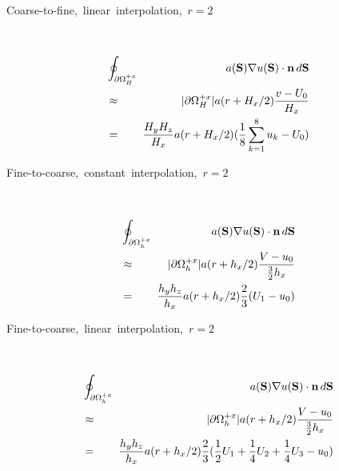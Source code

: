 \documentclass[10pt]{article}
\begin{document}
\begin{minipage}{1.75in}
\mbox{Coarse-to-fine, linear interpolation, $r=2$} \\
\end{minipage} \ \ \ \ 
\begin{minipage}{4.00in}
\begin{eqnarray*}
& \oint_{\partial\Omega_H^{+x}} \!\!\! & a(\textbf{S}) \nabla u(\textbf{S})\cdot \textbf{n} \, d\textbf{S}  \\
& \approx & |\partial\Omega_H^{+x}| a(r+H_x/2) \frac{v - U_0}{H_x} \\
& = & \frac{H_yH_z}{H_x}  a(r+H_x/2) (\frac{1}{8} \sum_{k=1}^8 u_k - U_0)   \\
\end{eqnarray*}
\end{minipage}

\begin{minipage}{1.75in}
\mbox{Fine-to-coarse, constant interpolation, $r=2$} \\
\end{minipage} \ \ \ \ 
\begin{minipage}{4.00in}
\begin{eqnarray*}
& \oint_{\partial\Omega_h^{+x}} \!\!\! & a(\textbf{S}) \nabla u(\textbf{S})\cdot \textbf{n} \, d\textbf{S}  \\
& \approx & |\partial\Omega_h^{+x}| a(r+h_x/2) \frac{V - u_0}{\frac{3}{2}h_x} \\
& = & \frac{h_yh_z}{h_x}  a(r+h_x/2) \frac{2}{3} (U_1 - u_0)   \\
\end{eqnarray*}
\end{minipage}

\begin{minipage}{1.75in}
\mbox{Fine-to-coarse, linear interpolation, $r=2$} \\
\end{minipage} \ \ \ \ 
\begin{minipage}{4.00in}
\begin{eqnarray*}
& \oint_{\partial\Omega_h^{+x}}  \!\!\! & a(\textbf{S}) \nabla u(\textbf{S})\cdot \textbf{n} \, d\textbf{S}  \\
& \approx & |\partial\Omega_h^{+x}| a(r+h_x/2) \frac{V - u_0}{\frac{3}{2}h_x} \\
& = & \frac{h_yh_z}{h_x}  a(r+h_x/2) \frac{2}{3} (\frac{1}{2}U_1 + \frac{1}{4}U_2 + \frac{1}{4}U_3 - u_0)   \\
\end{eqnarray*}
\end{minipage}
\end{document}
